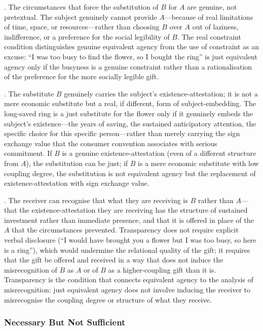 . The circumstances that force the substitution of $B$ for $A$ are genuine, not pretextual. The subject genuinely cannot provide $A$---because of real limitations of time, space, or resources---rather than choosing $B$ over $A$ out of laziness, indifference, or a preference for the social legibility of $B$. The real constraint condition distinguishes genuine equivalent agency from the use of constraint as an excuse: ``I was too busy to find the flower, so I bought the ring'' is just equivalent agency only if the busyness is a genuine constraint rather than a rationalisation of the preference for the more socially legible gift.

. The substitute $B$ genuinely carries the subject's existence-attestation; it is not a mere economic substitute but a real, if different, form of subject-embedding. The long-saved ring is a just substitute for the flower only if it genuinely embeds the subject's existence---the years of saving, the sustained anticipatory attention, the specific choice for this specific person---rather than merely carrying the sign exchange value that the consumer convention associates with serious commitment. If $B$ is a genuine existence-attestation (even of a different structure from $A$), the substitution can be just; if $B$ is a mere economic substitute with low coupling degree, the substitution is not equivalent agency but the replacement of existence-attestation with sign exchange value.

. The receiver can recognise that what they are receiving is $B$ rather than $A$---that the existence-attestation they are receiving has the structure of sustained investment rather than immediate presence, and that it is offered in place of the $A$ that the circumstances prevented. Transparency does not require explicit verbal disclosure (``I would have brought you a flower but I was too busy, so here is a ring''), which would undermine the relational quality of the gift; it requires that the gift be offered and received in a way that does not induce the misrecognition of $B$ as $A$ or of $B$ as a higher-coupling gift than it is. Transparency is the condition that connects equivalent agency to the analysis of misrecognition: just equivalent agency does not involve inducing the receiver to misrecognise the coupling degree or structure of what they receive.

\subsubsection{Necessary But Not Sufficient}
\label{p16:subsubsec:not_sufficient}

